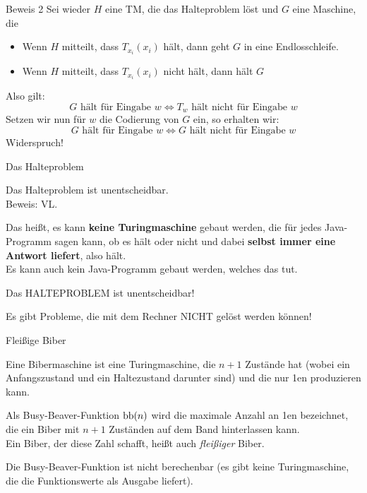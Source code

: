 {	\begin{frame}{Beweis 2}
		Sei wieder $H$ eine TM, die das Halteproblem löst und $G$ eine Maschine, die \begin{itemize}
			\item Wenn $H$ mitteilt, dass $T_{x_i} ( x_i )$ hält, dann geht $G$ in eine Endlosschleife.
			\item Wenn $H$ mitteilt, dass $T_{x_i} ( x_i )$ nicht hält, dann hält $G$
		\end{itemize}
		Also gilt: $$ G \text{ hält für Eingabe } w \iff T_w \text{ hält nicht für Eingabe } w $$
		Setzen wir nun für $w$ die Codierung von $G$ ein, so erhalten wir:
		$$ G \text{ hält für Eingabe } w \iff G \text{ hält nicht für Eingabe } w $$
		Widerspruch!
	\end{frame}
}

\begin{frame}{Das Halteproblem}
	\begin{Satz}
		Das Halteproblem ist unentscheidbar. \\
		Beweis: VL.
	\end{Satz}
	Das heißt, es kann \textbf{keine Turingmaschine} gebaut werden, die für jedes Java-Programm sagen kann, ob es hält oder nicht und dabei \textbf{selbst immer eine Antwort liefert}, also hält. \\ 
	\medskip \pause
	Es kann auch kein Java-Programm gebaut werden, welches das tut.
\end{frame}

\begin{headframe}
	\alert{\Huge Das HALTEPROBLEM ist unentscheidbar!}
\end{headframe}

\begin{headframe}
	\alert{\Huge Es gibt Probleme, die mit dem Rechner NICHT gelöst werden können!}
\end{headframe}

\begin{frame}{Fleißige Biber}
	\begin{Definition}
		Eine Bibermaschine ist eine Turingmaschine, die $n+1$ Zustände hat (wobei ein Anfangszustand und ein Haltezustand darunter sind) und die nur \word 1en produzieren kann.
	\end{Definition}
	\pause
	
	\begin{Definition}
		Als Busy-Beaver-Funktion ${\text{bb}}(n)$ wird die maximale Anzahl an \word 1en bezeichnet, die ein Biber mit $n+1$ Zuständen auf dem Band hinterlassen kann. \\
		Ein Biber, der diese Zahl schafft, heißt auch \emph{fleißiger} Biber.
	\end{Definition} 
	
	\begin{Satz}
		Die Busy-Beaver-Funktion ist nicht berechenbar (es gibt keine Turingmaschine, die die Funktionswerte als Ausgabe liefert).
	\end{Satz}
\end{frame}

